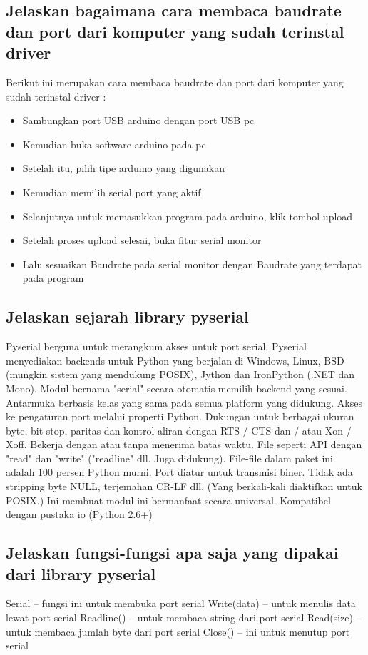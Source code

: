 \subsection{Jelaskan bagaimana cara membaca baudrate dan port dari komputer yang sudah terinstal driver}
Berikut ini merupakan cara membaca baudrate dan port dari komputer yang sudah terinstal driver :
\begin{itemize}
	\item Sambungkan port USB arduino dengan port USB pc
	\item Kemudian buka software arduino pada pc
	\item Setelah itu, pilih tipe arduino yang digunakan
	\item Kemudian memilih serial port yang aktif  
	\item Selanjutnya untuk memasukkan program pada arduino, klik tombol upload
	\item Setelah proses upload selesai, buka fitur serial monitor
	\item Lalu sesuaikan Baudrate pada serial monitor dengan Baudrate yang terdapat pada program
\end{itemize}

\subsection{Jelaskan sejarah library pyserial}
Pyserial berguna untuk merangkum akses untuk port serial. Pyserial menyediakan backends untuk Python yang berjalan di Windows, Linux, BSD (mungkin sistem yang mendukung POSIX), Jython dan IronPython (.NET dan Mono). Modul bernama "serial" secara otomatis memilih backend yang sesuai. Antarmuka berbasis kelas yang sama pada semua platform yang didukung.
Akses ke pengaturan port melalui properti Python.
Dukungan untuk berbagai ukuran byte, bit stop, paritas dan kontrol aliran dengan RTS / CTS dan / atau Xon / Xoff.
Bekerja dengan atau tanpa menerima batas waktu.
File seperti API dengan "read" dan "write" ("readline" dll. Juga didukung).
File-file dalam paket ini adalah 100 persen Python murni.
Port diatur untuk transmisi biner. Tidak ada stripping byte NULL, terjemahan CR-LF dll. (Yang berkali-kali diaktifkan untuk POSIX.) Ini membuat modul ini bermanfaat secara universal.
Kompatibel dengan pustaka io (Python 2.6+)

\subsection{Jelaskan fungsi-fungsi apa saja yang dipakai dari library pyserial}
Serial – fungsi ini untuk membuka port serial
Write(data) – untuk menulis data lewat port serial
Readline() – untuk membaca string dari port serial
Read(size) – untuk membaca jumlah byte dari port serial
Close() – ini untuk menutup port serial 


